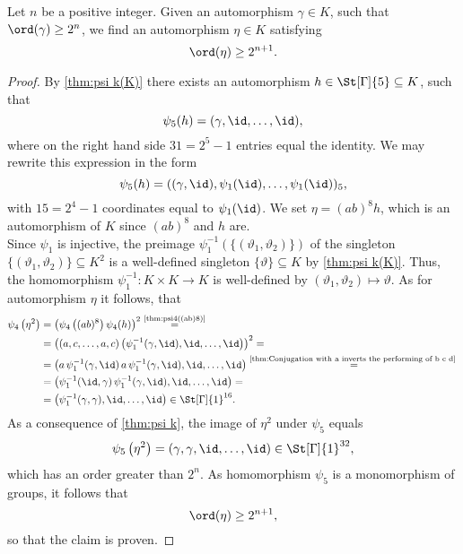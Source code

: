 \begin{lem}\label{thm:Inductive Step Infinite Growth}
Let $n$ be a positive integer. Given an automorphism $\gamma\in K$, such that $\ord(\gamma)\geq 2^n$, we find an automorphism $\eta\in K$ satisfying
\begin{equation*}
\ord(\eta)\geq 2^{n+1}. 
\end{equation*}
\end{lem}
\begin{proof}
By \cref{thm:psi k(K)} there exists an automorphism $h\in\St[\Gamma]{5}\subseteq K$, such that
\begin{equation*}
\psi_5(h)=(\gamma,\id,\ldots,\id),
\end{equation*}
where on the right hand side $31=2^5-1$ entries equal the identity. We may rewrite this expression in the form
\begin{equation*}
\psi_5(h)=((\gamma,\id),\psi_1(\id),\ldots,\psi_1(\id))_5,
\end{equation*}
with $15=2^4-1$ coordinates equal to $\psi_1(\id)$. We set $\eta=(ab)^8h$, which is an automorphism of $K$ since $(ab)^8$ and $h$ are.\\
Since $\psi_1$ is injective, the preimage $\psi_1^{-1}(\lbrace(\vartheta_1,\vartheta_2)\rbrace)$ of the singleton $\lbrace(\vartheta_1,\vartheta_2)\rbrace\subseteq K^2$ is a well-defined singleton $\lbrace\vartheta\rbrace\subseteq K$ by \cref{thm:psi k(K)}. Thus, the homomorphism $\psi_1^{-1}\colon K\times K\to K$ is well-defined by $(\vartheta_1,\vartheta_2)\mapsto\vartheta$. As for automorphism $\eta$ it follows, that
\begin{align*}
\psi_4\left(\eta^2\right)	&=\left(\psi_4\left((ab)^8\right)\psi_4(h)\right)^2\overset{\text{\cref{thm:psi4((ab)8)}}}{=}\\
				&=\left((a,c,\ldots,a,c)\left(\psi_1^{-1}(\gamma,\id),\id,\ldots,\id\right)\right)^2=\\
				&=\left(a\,\psi_1^{-1}(\gamma,\id)\,a\,\psi_1^{-1}(\gamma,\id),\id,\ldots,\id\right)\overset{\text{\cref{thm:Conjugation with a inverts the performing of b c d} }}{=}\\
				&=\left(\psi_1^{-1}(\id,\gamma)\,\psi_1^{-1}(\gamma,\id),\id,\ldots,\id\right)=\\
				&=\left(\psi_1^{-1}(\gamma,\gamma),\id,\ldots,\id\right)\in\St[\Gamma]{1}^{16}.
\end{align*}
As a consequence of \cref{thm:psi k}, the  image of $\eta^2$ under $\psi_5$ equals
\begin{equation*}
\psi_5\left(\eta^2\right)=(\gamma,\gamma,\id,\ldots,\id)\in\St[\Gamma]{1}^{32},
\end{equation*}
which has an order greater than $2^n$. As homomorphism $\psi_5$ is a monomorphism of groups, it follows that
\begin{equation*}
\ord(\eta)\geq 2^{n+1},
\end{equation*}
so that the claim is proven.
\end{proof}

